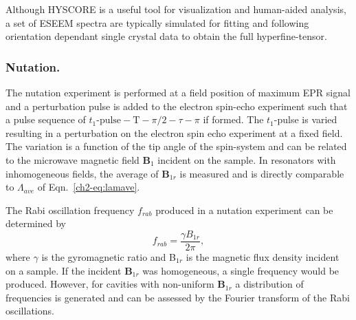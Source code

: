 Although HYSCORE is a useful tool for visualization and human-aided analysis, a set of ESEEM spectra are typically simulated for fitting and following orientation dependant single crystal data to obtain the full hyperfine-tensor. \cite{Shane1994SingleCrystalESEEM}

\subsubsection*{Nutation.}
The nutation experiment is performed at a field position of maximum EPR signal and a perturbation pulse is added to the electron spin-echo experiment such that a pulse sequence of ${t_1\text{-pulse}\!-\!\text{T}\!-\!\pi/2\!-\!\tau\!-\!\pi}$ if formed. The $t_1$-pulse is varied resulting in a perturbation on the electron spin echo experiment at a fixed field. The variation is a function of the tip angle of the spin-system and can be related to the microwave magnetic field $\mathbf{B}_1$ incident on the sample. In resonators with inhomogeneous fields, the average of $\mathbf{B}_{1r}$ is measured and is directly comparable to $\Lambda_{ave}$ of Eqn.~\ref{ch2-eq:lamave}.

The Rabi oscillation frequency $f_{rab}$ produced in a nutation experiment can be determined by
\begin{equation}
  f_{rab} = \frac{\gamma B_{1r}}{2 \pi }, \label{eqB1rrab}
\end{equation}
where $\gamma$ is the gyromagnetic ratio and B$_{1r}$ is the magnetic flux density incident on a sample. If the incident $\mathbf{B}_{1r}$ was homogeneous, a single frequency would be produced. However, for cavities with non-uniform $\mathbf{B}_{1r}$ a distribution of frequencies is generated and can be assessed by the Fourier transform of the Rabi oscillations. 

{\renewcommand{\bibsection}{\clearpage\section*{\bibname}\markboth{\bibname}{\bibname}}
\renewcommand{\bibname}{CHAPTER 2. REFERENCES}


}

